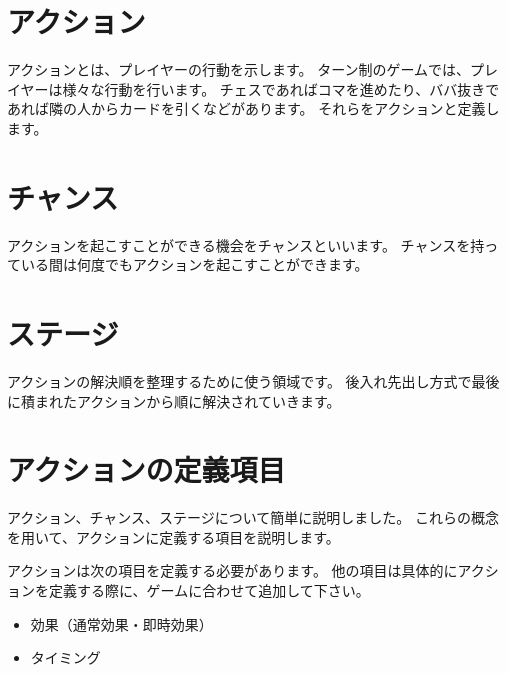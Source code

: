 \documentclass[letterpaper,10pt,dvipdfmx]{sphinxmanual}
\begin{document}
\ignorespaces 

\section{アクション}
\label{\detokenize{core/core:index-1}}\label{\detokenize{core/core:id3}}
\sphinxAtStartPar
アクションとは、プレイヤーの行動を示します。
ターン制のゲームでは、プレイヤーは様々な行動を行います。
チェスであればコマを進めたり、ババ抜きであれば隣の人からカードを引くなどがあります。
それらをアクションと定義します。

\ignorespaces 

\section{チャンス}
\label{\detokenize{core/core:index-2}}\label{\detokenize{core/core:id4}}
\sphinxAtStartPar
アクションを起こすことができる機会をチャンスといいます。
チャンスを持っている間は何度でもアクションを起こすことができます。

\ignorespaces 

\section{ステージ}
\label{\detokenize{core/core:index-3}}\label{\detokenize{core/core:id5}}
\sphinxAtStartPar
アクションの解決順を整理するために使う領域です。
後入れ先出し方式で最後に積まれたアクションから順に解決されていきます。


\section{アクションの定義項目}
\label{\detokenize{core/core:id6}}
\sphinxAtStartPar
アクション、チャンス、ステージについて簡単に説明しました。
これらの概念を用いて、アクションに定義する項目を説明します。

\sphinxAtStartPar
アクションは次の項目を定義する必要があります。
他の項目は具体的にアクションを定義する際に、ゲームに合わせて追加して下さい。
\begin{itemize}
\item {} 
\sphinxAtStartPar
効果（通常効果・即時効果）

\item {} 
\sphinxAtStartPar
タイミング

\end{itemize}
\end{document}
